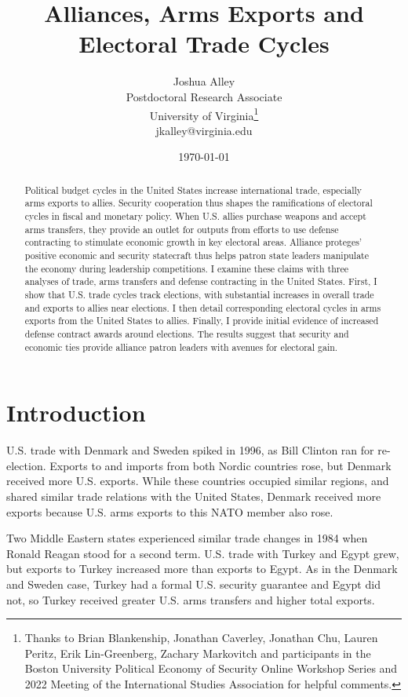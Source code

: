 \documentclass[12pt]{article}
\title{\textbf{Alliances, Arms Exports and Electoral Trade Cycles}}
\author{Joshua Alley \\
Postdoctoral Research Associate \\
University of Virginia\thanks{Thanks to Brian Blankenship, Jonathan Caverley, Jonathan Chu, Lauren Peritz, Erik Lin-Greenberg, Zachary Markovitch and participants in the Boston University Political Economy of Security Online Workshop Series and 2022 Meeting of the International Studies Association for helpful comments.} \\
jkalley@virginia.edu
}
\date{\today}
\begin{document}
\maketitle 

\begin{abstract} 
Political budget cycles in the United States increase international trade, especially arms exports to allies. 
Security cooperation thus shapes the ramifications of electoral cycles in fiscal and monetary policy.
When U.S. allies purchase weapons and accept arms transfers, they provide an outlet for outputs from efforts to use defense contracting to stimulate economic growth in key electoral areas.
Alliance proteges' positive economic and security statecraft thus helps patron state leaders manipulate the economy during leadership competitions.  
I examine these claims with three analyses of trade, arms transfers and defense contracting in the United States. 
First, I show that U.S. trade cycles track elections, with substantial increases in overall trade and exports to allies near elections.
I then detail corresponding electoral cycles in arms exports from the United States to allies. 
Finally, I provide initial evidence of increased defense contract awards around elections.
The results suggest that security and economic ties provide alliance patron leaders with avenues for electoral gain. 
\end{abstract} 


\newpage 
\doublespace 


\section{Introduction}


U.S. trade with Denmark and Sweden spiked in 1996, as Bill Clinton ran for re-election.
Exports to and imports from both Nordic countries rose, but Denmark received more U.S. exports.
While these countries occupied similar regions, and shared similar trade relations with the United States, Denmark received more exports because U.S. arms exports to this NATO member also rose.


Two Middle Eastern states experienced similar trade changes in 1984 when Ronald Reagan stood for a second term.
U.S. trade with Turkey and Egypt grew, but exports to Turkey increased more than exports to Egypt. 
As in the Denmark and Sweden case, Turkey had a formal U.S. security guarantee and Egypt did not, so Turkey received greater U.S. arms transfers and higher total exports. 
\end{document}
